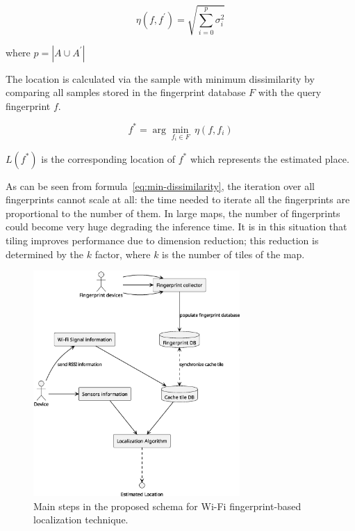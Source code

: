 \begin{equation}
	\eta(f, f^{'}) = \sqrt{\sum_{i=0}^{p} \sigma_i^{2}}
	\label{eq:dissimilarity}
\end{equation}

where $p = | A \cup A^{'} |$

The location is calculated via the sample with minimum dissimilarity by comparing all samples stored in the fingerprint database $F$ with the query
fingerprint $f$.

\begin{equation}
	f^{*} = \arg \min_{f_i \in F} \ \eta(f, f_i)
	\label{eq:min-dissimilarity}
\end{equation}

$L(f^{*})$ is the corresponding location of $f^{*}$ which represents the estimated place.

As can be seen from formula~\ref{eq:min-dissimilarity}, the iteration over all fingerprints cannot scale at all: the time needed to iterate all
the fingerprints are proportional to the number of them. In large maps, the number of fingerprints could become very huge degrading the inference
time. It is in this situation that tiling improves performance due to dimension reduction; this reduction is determined by the $k$ factor, where
$k$ is the number of tiles of the map.

\begin{figure}[H]
	\centering
	\includegraphics[width=0.7\textwidth]{img/fingerprint-schema.eps}
	\caption{Main steps in the proposed schema for Wi-Fi fingerprint-based localization technique.}
	\label{fig:fingerprint-schema}
\end{figure}

